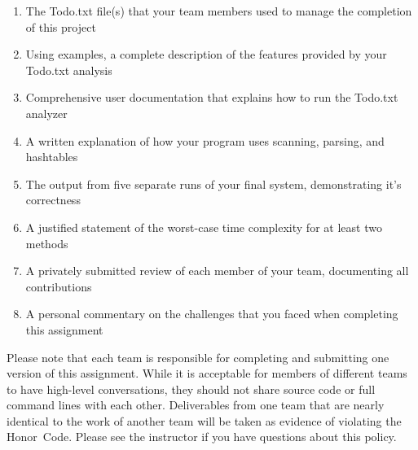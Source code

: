   
  \vspace*{-.05in}
 \begin{enumerate} 
  \itemsep0pt

  \item The Todo.txt file(s) that your team members used to manage the completion of this project

  \item Using examples, a complete description of the features provided by your Todo.txt analysis

  \item Comprehensive user documentation that explains how to run the Todo.txt analyzer

  \item A written explanation of how your program uses scanning, parsing, and hashtables

  \item The output from five separate runs of your final system, demonstrating it's correctness 

  \item A justified statement of the worst-case time complexity for at least two methods 

  \item A privately submitted review of each member of your team, documenting all contributions 

  \item A personal commentary on the challenges that you faced when completing this assignment 
   
  \end{enumerate}
  \vspace*{-.05in}

  Please note that each team is responsible for completing and submitting one version of this assignment.  While it is
  acceptable for members of different teams to have high-level conversations, they should not share source code or
  full command lines with each other.  Deliverables from one team that are nearly identical to the work of another team
  will be taken as evidence of violating the \mbox{Honor Code}.  Please see the instructor if you have questions about
  this policy.

  
